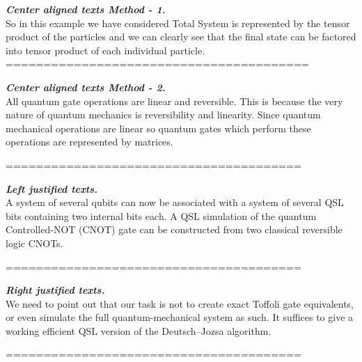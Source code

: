 \documentclass{article}
\begin{document}
	
	\centering					%
	\textbf{\textit{Center aligned texts Method - 1.}} \\
	
	So in this example we have considered Total System is represented by the tensor product of the particles and we can clearly see that the final state can be factored	into tensor product of each individual particle.
	========================================
	
	\begin{center}
		
	\textbf{\textit{Center aligned texts Method - 2.}} \\
	
	All quantum gate operations are linear and reversible. This is because the very nature of quantum mechanics is reversibility and linearity. Since quantum mechanical operations are linear so quantum gates which perform these operations are represented by matrices.
	
	\end{center}
	=======================================
					
	\begin{flushleft}
		
		\textbf{\textit{Left justified texts.}}\\
		
		A system of several qubits can now be associated with a system of several QSL bits containing two internal bits each. A QSL simulation of the quantum Controlled-NOT (CNOT) gate can be constructed from two classical reversible logic CNOTs.
		
	\end{flushleft}
	=======================================
	
	\begin{flushright}
		
		\textbf{\textit{Right justified texts.}}\\
		
		We need to point out that our task is not to create exact Toffoli gate equivalents, or even simulate the full quantum-mechanical system as such. It suffices to give a working efficient QSL version of the Deutsch–Jozsa algorithm.
		
	\end{flushright}
	=======================================
	
\end{document}
